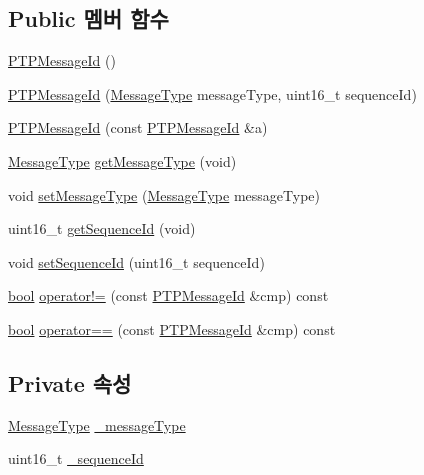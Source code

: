 \subsection*{Public 멤버 함수}
\begin{DoxyCompactItemize}
\item 
\hyperlink{class_p_t_p_message_id_a3355db47f980481b19f1c518ee9c132a}{P\+T\+P\+Message\+Id} ()
\item 
\hyperlink{class_p_t_p_message_id_ae5495e76bb458842f06010f843452d3f}{P\+T\+P\+Message\+Id} (\hyperlink{avbts__message_8hpp_ac6606ebe91c8ac66a2c314c79f5ab013}{Message\+Type} message\+Type, uint16\+\_\+t sequence\+Id)
\item 
\hyperlink{class_p_t_p_message_id_a954300b410fa7cfae9fde11d1aaa4ed2}{P\+T\+P\+Message\+Id} (const \hyperlink{class_p_t_p_message_id}{P\+T\+P\+Message\+Id} \&a)
\item 
\hyperlink{avbts__message_8hpp_ac6606ebe91c8ac66a2c314c79f5ab013}{Message\+Type} \hyperlink{class_p_t_p_message_id_aa9e0a02eadc0da0ddbade7fdb09d9309}{get\+Message\+Type} (void)
\item 
void \hyperlink{class_p_t_p_message_id_a48ce86c4dfba93d4cf533b53f6c8ee86}{set\+Message\+Type} (\hyperlink{avbts__message_8hpp_ac6606ebe91c8ac66a2c314c79f5ab013}{Message\+Type} message\+Type)
\item 
uint16\+\_\+t \hyperlink{class_p_t_p_message_id_abd5cac5701120cbbfc56129b31fa801f}{get\+Sequence\+Id} (void)
\item 
void \hyperlink{class_p_t_p_message_id_a1a24ddc853c27de51012c1904f4181fe}{set\+Sequence\+Id} (uint16\+\_\+t sequence\+Id)
\item 
\hyperlink{avb__gptp_8h_af6a258d8f3ee5206d682d799316314b1}{bool} \hyperlink{class_p_t_p_message_id_aea7fd0af9627838246f167dc020c9599}{operator!=} (const \hyperlink{class_p_t_p_message_id}{P\+T\+P\+Message\+Id} \&cmp) const 
\item 
\hyperlink{avb__gptp_8h_af6a258d8f3ee5206d682d799316314b1}{bool} \hyperlink{class_p_t_p_message_id_a4f2aa63ed76a472b3665cc80505067df}{operator==} (const \hyperlink{class_p_t_p_message_id}{P\+T\+P\+Message\+Id} \&cmp) const 
\end{DoxyCompactItemize}
\subsection*{Private 속성}
\begin{DoxyCompactItemize}
\item 
\hyperlink{avbts__message_8hpp_ac6606ebe91c8ac66a2c314c79f5ab013}{Message\+Type} \hyperlink{class_p_t_p_message_id_ae8e355e37a0e83fbb846b7ee23900fe9}{\+\_\+message\+Type}
\item 
uint16\+\_\+t \hyperlink{class_p_t_p_message_id_a8be1fa79bd83ac24f3d0cc0d80d6d8f4}{\+\_\+sequence\+Id}
\end{DoxyCompactItemize}


